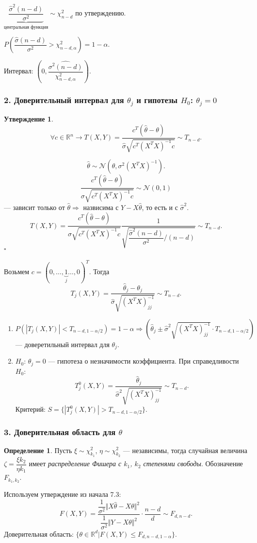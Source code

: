 \documentclass[12pt]{report}
\renewenvironment{proof}{{\bfseries Доказательство:}}{$\square$\\\\}
\newtheorem{proposition}{Утверждение}
\theoremstyle{definition}
\newtheorem{definition}{Определение}
\begin{document}
$\underbrace{\dfrac{\hat{\sigma}^2(n-d)}{\sigma^2}}_{\text{центральная функция}} \sim \chi^2_{n-d}$ по утверждению.

$P\left(\dfrac{\hat{\sigma} (n-d)}{\sigma^2} > \chi^2_{n-d, \alpha}\right) = 1 - \alpha$.

Интервал: $\left(0, \dfrac{\hat{\sigma^2(n-d)}}{\chi^2_{n-d, \alpha}}\right)$.

\subsubsection{2. Доверительный интервал для $\theta_j$ и гипотезы $H_0$: $\theta_j = 0$}
\begin{proposition}
	$$\forall c \in \mathbb{R}^n \rightarrow T(X, Y) = \dfrac{c^T(\hat{\theta} - \theta)}{\hat{\sigma}\sqrt{c^T(X^T X)^{-1}c}} \sim T_{n-d}.$$
\end{proposition}
\begin{proof}
	$$\hat{\theta} \sim \mathcal{N}(\theta, \sigma^2(X^T X)^{-1}).$$
	$$\dfrac{c^T(\hat{\theta} - \theta)}{\sigma\sqrt{c^T (X^T X)^{-1}c}} \sim \mathcal{N}(0, 1)$$
	— зависит только от $\hat{\theta} \Rightarrow$ назвисима с $Y - X\hat{\theta}$, то есть и с $\hat{\sigma}^2$.
	$$T(X, Y) = \dfrac{c^T(\hat{\theta} - \theta)}{\sigma\sqrt{c^T(X^T X)^{-1}c}} \dfrac{1}{\sqrt{\dfrac{\hat{\sigma}^2(n-d)}{\sigma^2}/(n-d)}}\sim T_{n-d}.$$
\end{proof}
Возьмем $c = (0, \ldots, \underbrace{1}_{j} \ldots, 0)^T$. Тогда
$$T_j(X, Y) = \dfrac{\hat{\theta}_j - \theta_j}{\hat{\sigma}\sqrt{(X^T X)^{-1}_{jj}}} \sim T_{n-d}.$$
\begin{enumerate}
	\item $P(|T_j(X, Y)| < T_{n-d, 1-\alpha/2}) = 1 - \alpha \Rightarrow (\hat{\theta}_j \pm \hat{\sigma}^2\sqrt{(X^T X)^{-1}_{jj}}\cdot T_{n-d,1-\alpha/2})$ — доверетильный интервал для $\theta_j$.
	\item $H_0$: $\theta_j = 0$ — гипотеза о незначимости коэффициента. При справедливости $H_0$:
	$$T_j^0(X, Y) = \dfrac{\hat{\theta}_j}{\hat{\sigma}^2\sqrt{(X^T X)^{-1}_{jj}}} \sim T_{n-d}.$$
	Критерий: $S =\{|T_j^0(X, Y)| > T_{n-d,1-\alpha/2}\}$.
\end{enumerate}

\subsubsection{3. Доверительная область для $\theta$}
\begin{definition}
	Пусть $\xi \sim \chi^2_{k_1}$, $\eta \sim \chi^2_{k_2}$ — независимы, тогда случайная величина $\zeta = \dfrac{\xi k_2}{\eta k_1}$ имеет \emph{распределение Фишера с $k_1$, $k_2$ степенями свободы}. Обозначение $F_{k_1, k_2}$.
\end{definition}
Используем утверждение из начала 7.3:
$$F(X, Y) = \dfrac{\dfrac{1}{\sigma^2}\Vert X\hat{\theta} - X\theta\Vert^2}{\dfrac{1}{\sigma^2}\Vert Y - X\theta\Vert^2} \cdot \dfrac{n-d}{d} \sim F_{d, n-d}.$$
Доверительная область: $\{\theta \in \mathbb{R}^d | F(X, Y) \leqslant F_{d, n-d, 1-\alpha}\}$.
\end{document}
